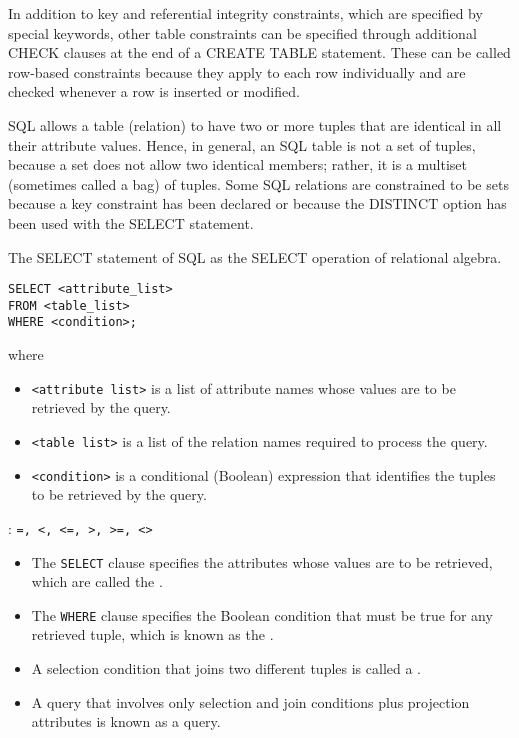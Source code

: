     \par In addition to key and referential integrity constraints, which are specified by special keywords, other table constraints can be specified through additional CHECK clauses at the end of a CREATE TABLE statement. These can be called row-based constraints because they apply to each row individually and are checked whenever a row is inserted or modified.


    \par SQL allows a table (relation) to have two or more tuples that are identical in all their attribute values. Hence, in general, an SQL table is not a set of tuples, because a set does not
allow two identical members; rather, it is a multiset (sometimes called a bag) of tuples. Some SQL relations are constrained to be sets because a key constraint has been declared or because the DISTINCT option has been used with the SELECT statement.

    \par The SELECT statement of SQL  as the SELECT operation of relational algebra.

    \begin{verbatim}
SELECT <attribute_list>
FROM <table_list>
WHERE <condition>;
    \end{verbatim}
      where
    \begin{itemize}
      \item \lstinline{<attribute list>} is a list of attribute names whose values are to be retrieved by the query.
      \item \lstinline{<table list>} is a list of the relation names required to process the query.
      \item \lstinline{<condition>} is a conditional (Boolean) expression that identifies the tuples to be retrieved by the query.
    \end{itemize}

    \par {}: \lstinline{=, <, <=, >, >=, <>}

    \begin{itemize}
      \item The \lstinline{SELECT} clause specifies the attributes whose values are to be retrieved, which are called the .
      \item The \lstinline{WHERE} clause specifies the Boolean condition that must be true for any retrieved tuple, which is known as the .
      \item A selection condition that joins two different tuples is called a .
      \item A query that involves only selection and join conditions plus projection attributes is known as a  query.
    \end{itemize}

